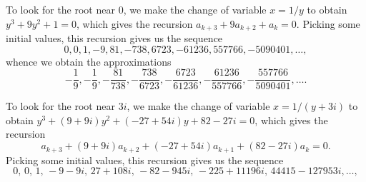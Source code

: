 \documentclass[12pt]{article}
\begin{document}
To look for the root near $0$, we make the change of variable $x = 
1 / y$ to obtain $y^3 + 9 y^2 + 1 = 0$, which gives the recursion
$a_{k+3} + 9 a_{k+2} + a_k = 0$.  Picking some initial values, this
recursion gives us the sequence
\[
0, 0, 1, -9, 81, -738, 6723, -61236, 557766, -5090401, \ldots,
\]
whence we obtain the approximations
\[
-\frac{1}{9}, -\frac{1}{9}, -\frac{81}{738}, -\frac{738}{6723},
-\frac{6723}{61236}, -\frac{61236}{557766}, 
-\frac{557766}{5090401}, \ldots.
\]

To look for the root near $3i$, we make the change of variable
$x = 1 / (y + 3 i)$ to obtain $y^3 + (9 + 9 i) y^2 + (-27 + 54 i) y
+ 82 - 27 i = 0$, which gives the recursion
\[
 a_{k+3} + (9 + 9 i) a_{k+2} + (-27 + 54 i) a_{k+1} + 
           (82 - 27 i) a_k = 0.
\]
Picking some initial values, this
recursion gives us the sequence
\[
 0,\, 0,\, 1,\, - 9 - 9 i,\, 27 + 108 i,\, -82 - 945 i,\, 
 - 225 + 11196 i,\, 44415 - 127953 i, \ldots,
\]
\end{document}
